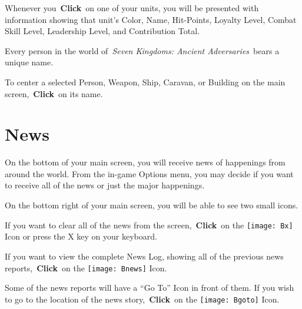 Whenever you \textbf{Click} on one of your units, you will be presented with information showing that unit’s Color, Name, Hit-Points, Loyalty Level, Combat Skill Level, Leadership Level, and Contribution Total.

Every person in the world of \textit{Seven Kingdoms: Ancient Adversaries} bears a unique name.


To center a selected Person, Weapon, Ship, Caravan, or Building on the main screen, \textbf{Click} on its name.

\section{News}


On the bottom of your main screen, you will receive news of happenings from around the world. From the in-game Options menu, you may decide if you want to receive all of the news or just the major happenings.

On the bottom right of your main screen, you will be able to see two small icons.

If you want to clear all of the news from the screen, \textbf{Click} on the \texttt{[image: Bx]} Icon or press the X key on your keyboard.

If you want to view the complete News Log, showing all of the previous news reports, \textbf{Click} on the \texttt{[image: Bnews]} Icon.

Some of the news reports will have a “Go To” Icon in front of them. If you wish to go to the location of the news story, \textbf{Click} on the \texttt{[image: Bgoto]} Icon.